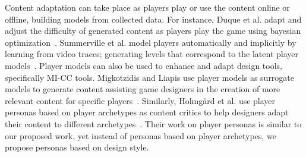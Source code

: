 Content adaptation can take place as players play or use the content online or offline, building models from collected data. For instance, Duque et al. adapt and adjust the difficulty of generated content as players play the game using bayesian optimization~\cite{p10Duque2021-BayesianbasedPlayerModel}. Summerville et al. model players automatically and implicitly by learning from video traces; generating levels that correspond to the latent player models~\cite{p10Summerville2016-LearningPlayerTailoredPlatformer}. Player models can also be used to enhance and adapt design tools, specifically MI-CC tools. Migkotzidis and Liapis use player models as surrogate models to generate content assisting game designers in the creation of more relevant content for specific players~\cite{p10Panagiotis2021-susketch}. Similarly, Holmgård et al. use player personas based on player archetypes as content critics to help designers adapt their content to different archetypes~\cite{p10Holmgard2019-proceduralPersonas}. Their work on player personas is similar to our proposed work, yet instead of personas based on player archetypes, we propose personas based on design style.




















